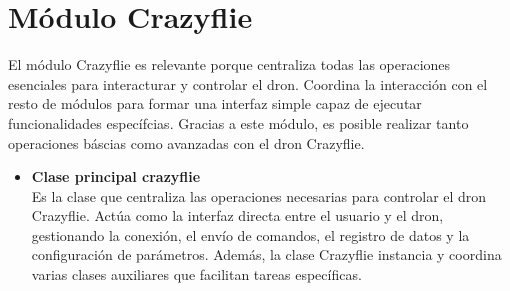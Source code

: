 \newpage
\section{Módulo Crazyflie}
El módulo Crazyflie es relevante porque centraliza todas las operaciones esenciales para interacturar y controlar el dron. Coordina la interacción con el resto de módulos para formar una interfaz simple capaz de ejecutar funcionalidades específcias. Gracias a este módulo, es posible realizar tanto operaciones báscias como avanzadas con el dron Crazyflie.

\begin{itemize}
	\item \textbf{Clase principal crazyflie}
	\vspace{0.1cm} %
	\\Es la clase que centraliza las operaciones necesarias para controlar el dron Crazyflie. Actúa como la interfaz directa entre el usuario y el dron, gestionando la conexión, el envío de comandos, el registro de datos y la configuración de parámetros. Además, la clase Crazyflie instancia y coordina varias clases auxiliares que facilitan tareas específicas. %
\end{itemize}

